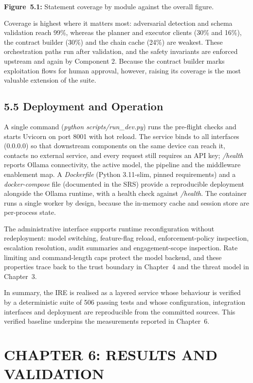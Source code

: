 \documentclass[
]{article}
\begin{document}
\protect\hypertarget{_Toc900113}{}{}\textbf{Figure~5.1:} Statement
coverage by module against the overall figure.

Coverage is highest where it matters most: adversarial detection and
schema validation reach 99\%, whereas the planner and executor clients
(30\% and 16\%), the contract builder (30\%) and the chain cache (24\%)
are weakest. These orchestration paths run after validation, and the
safety invariants are enforced upstream and again by Component 2.
Because the contract builder marks exploitation flows for human
approval, however, raising its coverage is the most valuable extension
of the suite.

\hypertarget{deployment-and-operation}{%
\subsection{5.5 Deployment and
Operation}\label{deployment-and-operation}}

A single command (\emph{python scripts/run\_dev.py}) runs the pre-flight
checks and starts Uvicorn on port 8001 with hot reload. The service
binds to all interfaces (0.0.0.0) so that downstream components on the
same device can reach it, contacts no external service, and every
request still requires an API key; \emph{/health} reports Ollama
connectivity, the active model, the pipeline and the middleware
enablement map. A \emph{Dockerfile} (Python 3.11-slim, pinned
requirements) and a \emph{docker-compose} file (documented in the SRS)
provide a reproducible deployment alongside the Ollama runtime, with a
health check against \emph{/health}. The container runs a single worker
by design, because the in-memory cache and session store are per-process
state.

The administrative interface supports runtime reconfiguration without
redeployment: model switching, feature-flag reload, enforcement-policy
inspection, escalation resolution, audit summaries and engagement-scope
inspection. Rate limiting and command-length caps protect the model
backend, and these properties trace back to the trust boundary in
Chapter~4 and the threat model in Chapter~3.

In summary, the IRE is realised as a layered service whose behaviour is
verified by a deterministic suite of 506 passing tests and whose
configuration, integration interfaces and deployment are reproducible
from the committed sources. This verified baseline underpins the
measurements reported in Chapter~6.

\hypertarget{chapter-6-results-and-validation}{%
\section{CHAPTER 6: RESULTS AND
VALIDATION}\label{chapter-6-results-and-validation}}
\end{document}
